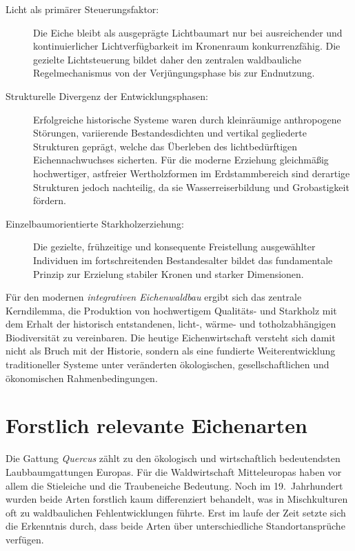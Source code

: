 \documentclass[twocolumn, bibliography=totoc, abstract=true]{scrartcl}
\begin{document}
\begin{description}
\item[Licht als primärer Steuerungsfaktor:] Die Eiche bleibt als ausgeprägte Lichtbaumart nur bei ausreichender und kontinuierlicher Lichtverfügbarkeit im Kronenraum konkurrenzfähig. Die gezielte Lichtsteuerung bildet daher den zentralen waldbauliche Regelmechanismus von der Verjüngungsphase bis zur Endnutzung.
\item[Strukturelle Divergenz der Entwicklungsphasen:] Erfolgreiche historische Systeme waren durch kleinräumige anthropogene Störungen, variierende Bestandesdichten und vertikal gegliederte Strukturen geprägt, welche das Überleben des lichtbedürftigen Eichennachwuchses sicherten. Für die moderne Erziehung gleichmäßig hochwertiger, astfreier Wertholzformen im Erdstammbereich sind derartige Strukturen jedoch nachteilig, da sie Wasserreiserbildung und Grobastigkeit fördern.
\item[Einzelbaumorientierte Starkholzerziehung:] Die gezielte, frühzeitige und konsequente Freistellung ausgewählter Individuen im fortschreitenden Bestandesalter bildet das fundamentale Prinzip zur Erzielung stabiler Kronen und starker Dimensionen.
\end{description}

Für den modernen \textit{integrativen Eichenwaldbau} ergibt sich das zentrale Kerndilemma, die Produktion von hochwertigem Qualitäts- und Starkholz mit dem Erhalt der historisch entstandenen, licht-, wärme- und totholzabhängigen Biodiversität zu vereinbaren. Die heutige Eichenwirtschaft versteht sich damit nicht als Bruch mit der Historie, sondern als eine fundierte Weiterentwicklung traditioneller Systeme unter veränderten ökologischen, gesellschaftlichen und ökonomischen Rahmenbedingungen.


\section{Forstlich relevante Eichenarten}

Die Gattung \textit{Quercus} zählt zu den ökologisch und wirtschaftlich bedeutendsten Laubbaumgattungen Europas. Für die Waldwirtschaft Mitteleuropas haben vor allem die Stieleiche und die Traubeneiche Bedeutung. Noch im 19.~Jahrhundert wurden beide Arten forstlich kaum differenziert behandelt, was in Mischkulturen oft zu waldbaulichen Fehlentwicklungen führte. Erst im laufe der Zeit setzte sich die Erkenntnis durch, dass beide Arten über unterschiedliche Standortansprüche verfügen.
\end{document}
